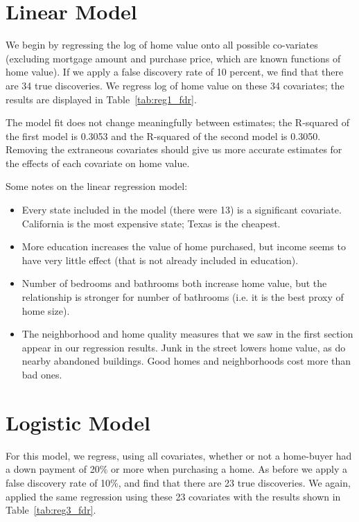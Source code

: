 \documentclass[11pt, fleqn]{article}
\begin{document}
\section{Linear Model}

We begin by regressing the log of home value onto all possible co-variates (excluding mortgage amount and purchase price, which are known functions of home value). If we apply a false discovery rate of 10 percent, we find that there are 34 true discoveries. We regress log of home value on these 34 covariates; the results are displayed in Table~\vref{tab:reg1_fdr}.

The model fit does not change meaningfully between estimates; the R-squared of the first model is 0.3053 and the R-squared of the second model is 0.3050. Removing the extraneous covariates should give us more accurate estimates for the effects of each covariate on home value.

Some notes on the linear regression model:
\begin{itemize}
  \item Every state included in the model (there were 13) is a significant covariate. California is the most expensive state; Texas is the cheapest.
  \item More education increases the value of home purchased, but income seems to have very little effect (that is not already included in education).
  \item Number of bedrooms and bathrooms both increase home value, but the relationship is stronger for number of bathrooms (i.e. it is the best proxy of home size).
  \item The neighborhood and home quality measures that we saw in the first section appear in our regression results. Junk in the street lowers home value, as do nearby abandoned buildings. Good homes and neighborhoods cost more than bad ones.
\end{itemize}



\section{Logistic Model}
For this model, we regress, using all covariates, whether or not a home-buyer had a down payment of 20\% or more when purchasing a home.  As before we apply a false discovery rate of 10\%, and find that there are 23 true discoveries.  We again, applied the same regression using these 23 covariates with the results shown in Table~\vref{tab:reg3_fdr}.
\end{document}

